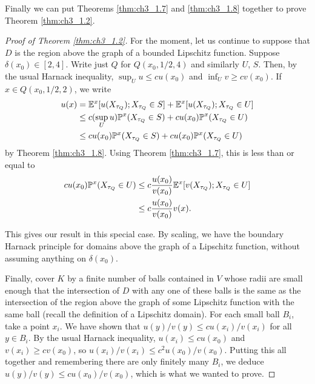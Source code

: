 
Finally we can put Theorems \ref{thm:ch3_1.7} and \ref{thm:ch3_1.8} together to prove Theorem \ref{thm:ch3_1.2}.

\begin{proof}[Proof of Theorem \ref{thm:ch3_1.2}]
For the moment, let us continue to suppose that $D$ is the region above the graph of a bounded Lipschitz function. Suppose $\delta(x_0) \in [2,4]$. Write just $Q$ for $Q(x_0,1/2,4)$ and similarly $U$, $S$. Then, by the usual Harnack inequality, $\sup_U u \leq cu(x_0)$ and $\inf_U v \geq cv(x_0)$. If $x \in Q(x_0,1/2,2)$, we write
\begin{align}\label{eq:ch3_1.19}
    u(x) &= \mathbb{E}^x[u(X_{\tau_Q}); X_{\tau_Q} \in S] + \mathbb{E}^x[u(X_{\tau_Q}); X_{\tau_Q} \in U] \\
    &\leq c(\sup_U u)\mathbb{P}^x(X_{\tau_Q} \in S) + cu(x_0)\mathbb{P}^x(X_{\tau_Q} \in U) \notag \\
    &\leq cu(x_0)\mathbb{P}^x(X_{\tau_Q} \in S) + cu(x_0)\mathbb{P}^x(X_{\tau_Q} \in U) \notag
\end{align}
by Theorem \ref{thm:ch3_1.8}. Using Theorem \ref{thm:ch3_1.7}, this is less than or equal to
\begin{align*}
    cu(x_0)\mathbb{P}^x(X_{\tau_Q} \in U) &\leq c\frac{u(x_0)}{v(x_0)}\mathbb{E}^x[v(X_{\tau_Q}); X_{\tau_Q} \in U] \\
    &\leq c\frac{u(x_0)}{v(x_0)}v(x).
\end{align*}

This gives our result in this special case. By scaling, we have the boundary Harnack principle for domains above the graph of a Lipschitz function, without assuming anything on $\delta(x_0)$.

Finally, cover $K$ by a finite number of balls contained in $V$ whose radii are small enough that the intersection of $D$ with any one of these balls is the same as the intersection of the region above the graph of some Lipschitz function with the same ball (recall the definition of a Lipschitz domain). For each small ball $B_i$, take a point $x_i$. We have shown that $u(y)/v(y) \leq cu(x_i)/v(x_i)$ for all $y \in B_i$. By the usual Harnack inequality, $u(x_i) \leq cu(x_0)$ and $v(x_i) \geq cv(x_0)$, so $u(x_i)/v(x_i) \leq c^2u(x_0)/v(x_0)$. Putting this all together and remembering there are only finitely many $B_i$, we deduce $u(y)/v(y) \leq cu(x_0)/v(x_0)$, which is what we wanted to prove.
\end{proof}


